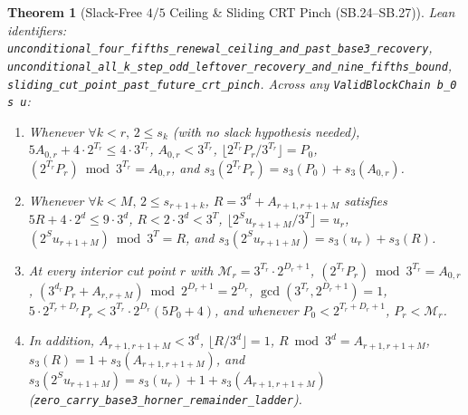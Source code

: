 \documentclass[11pt]{article}
\newtheorem{theorem}{Theorem}[section]
\begin{document}
\begin{theorem}[Slack-Free $4/5$ Ceiling \& Sliding CRT Pinch (SB.24--SB.27)]
\emph{Lean identifiers:} \nolinkurl{unconditional_four_fifths_renewal_ceiling_and_past_base3_recovery}, \nolinkurl{unconditional_all_k_step_odd_leftover_recovery_and_nine_fifths_bound}, \nolinkurl{sliding_cut_point_past_future_crt_pinch}.
Across any \texttt{ValidBlockChain b\_0 s u}:
\begin{enumerate}
  \item Whenever $\forall k < r,\, 2 \le s_k$ (with no slack hypothesis needed), $5 A_{0,r} + 4 \cdot 2^{T_r} \le 4 \cdot 3^{T_r}$, $A_{0,r} < 3^{T_r}$, $\lfloor 2^{T_r} P_r / 3^{T_r} \rfloor = P_0$, $(2^{T_r} P_r) \bmod 3^{T_r} = A_{0,r}$, and $s_3(2^{T_r} P_r) = s_3(P_0) + s_3(A_{0,r})$.
  \item Whenever $\forall k < M,\, 2 \le s_{r+1+k}$, $R = 3^d + A_{r+1, r+1+M}$ satisfies $5 R + 4 \cdot 2^d \le 9 \cdot 3^d$, $R < 2 \cdot 3^d < 3^T$, $\lfloor 2^S u_{r+1+M} / 3^T \rfloor = u_r$, $(2^S u_{r+1+M}) \bmod 3^T = R$, and $s_3(2^S u_{r+1+M}) = s_3(u_r) + s_3(R)$.
  \item At every interior cut point $r$ with $\mathcal{M}_r = 3^{T_r} \cdot 2^{D_r + 1}$, $(2^{T_r} P_r) \bmod 3^{T_r} = A_{0,r}$, $(3^{d_r} P_r + A_{r, r+M}) \bmod 2^{D_r + 1} = 2^{D_r}$, $\gcd(3^{T_r}, 2^{D_r + 1}) = 1$, $5 \cdot 2^{T_r + D_r} P_r < 3^{T_r} \cdot 2^{D_r}(5 P_0 + 4)$, and whenever $P_0 < 2^{T_r + D_r + 1}$, $P_r < \mathcal{M}_r$.
  \item In addition, $A_{r+1, r+1+M} < 3^d$, $\lfloor R / 3^d \rfloor = 1$, $R \bmod 3^d = A_{r+1, r+1+M}$, $s_3(R) = 1 + s_3(A_{r+1, r+1+M})$, and $s_3(2^S u_{r+1+M}) = s_3(u_r) + 1 + s_3(A_{r+1, r+1+M})$ (\nolinkurl{zero_carry_base3_horner_remainder_ladder}).
\end{enumerate}
\end{theorem}
\end{document}
